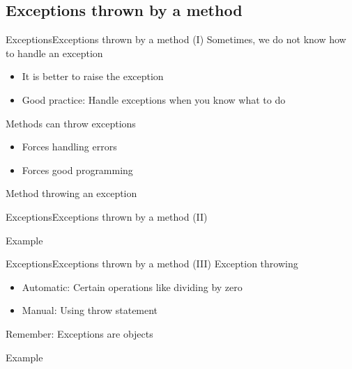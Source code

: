 \documentclass[10pt,compress]{beamer} %
\begin{document}
\subsection{Exceptions thrown by a method}
\begin{frame}{Exceptions}{Exceptions thrown by a method (I)}
	Sometimes, we do not know how to handle an exception
		\begin{itemize}
		\item It is better to raise the exception
		\item Good practice: Handle exceptions when you know what to do
		\end{itemize}
	Methods can throw exceptions
		\begin{itemize}
		\item Forces handling errors
		\item Forces good programming
		\end{itemize}
	
	\begin{block}{Method throwing an exception}
	\vspace{-0.2cm}
		
	\vspace{-0.2cm}
	\end{block}
\end{frame}

\begin{frame}{Exceptions}{Exceptions thrown by a method (II)}
	\begin{block}{Example}
	\vspace{-0.2cm}
		
	\vspace{-0.2cm}
	\end{block}
\end{frame}

\begin{frame}{Exceptions}{Exceptions thrown by a method (III)}
	Exception throwing
		\begin{itemize}
		\item Automatic: Certain operations like dividing by zero
		\item Manual: Using \alert{throw} statement
		\end{itemize}
	Remember: Exceptions are objects
	
	\begin{block}{Example}
	\vspace{-0.2cm}
		
	\vspace{-0.2cm}
	\end{block}
\end{frame}
\end{document}
